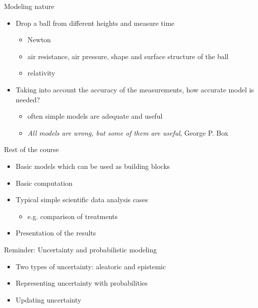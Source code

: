 \documentclass[english,t]{beamer}
\begin{document}
\begin{frame}{Modeling nature}

  \begin{itemize}
  \item Drop a ball from different heights and measure time
    \pause
    \begin{itemize}
    \item Newton
    \item air resistance, air pressure, shape and surface structure of the ball
    \item relativity
    \end{itemize}
    \pause
  \item Taking into account the accuracy of the measurements, how
    accurate model is needed?
    \pause
    \begin{itemize}
    \item often simple models are adequate and useful
    \item \emph{All models are wrong, but some of them are useful},
      George P. Box
    \end{itemize}
  \end{itemize}

\end{frame}

\begin{frame}{Rest of the course}

  \begin{itemize}
  \item Basic models which can be used as building blocks
    \vspace{\baselineskip}
  \item Basic computation
    \vspace{\baselineskip}
  \item Typical simple scientific data analysis cases
     \begin{itemize}
     \item e.g. comparison of treatments
     \end{itemize}
    \vspace{\baselineskip}
  \item Presentation of the results
  \end{itemize}
\end{frame}


\begin{frame}{Reminder: Uncertainty and probabilistic modeling}

  \begin{itemize}
  \item Two types of uncertainty: aleatoric and epistemic
    \vspace{\baselineskip}
  \item Representing uncertainty with probabilities
    \vspace{\baselineskip}
  \item Updating uncertainty
    \vspace{\baselineskip}
   \end{itemize}
\end{frame}
\end{document}

